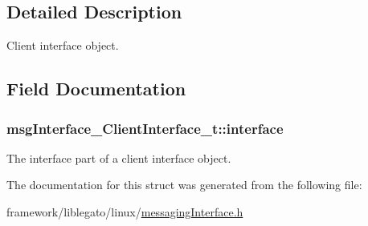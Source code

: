 \subsection{Detailed Description}
Client interface object. 

\subsection{Field Documentation}
\subsubsection[{\texorpdfstring{interface}{interface}}]{ msg\+Interface\+\_\+\+Client\+Interface\+\_\+t\+::interface}\hypertarget{structmsg_interface___client_interface__t_ae47c1c05e49def8707ca81f26aba5e48}{}\label{structmsg_interface___client_interface__t_ae47c1c05e49def8707ca81f26aba5e48}


The interface part of a client interface object. 



The documentation for this struct was generated from the following file\+:\begin{DoxyCompactItemize}
\item 
framework/liblegato/linux/\hyperlink{messaging_interface_8h}{messaging\+Interface.\+h}\end{DoxyCompactItemize}

